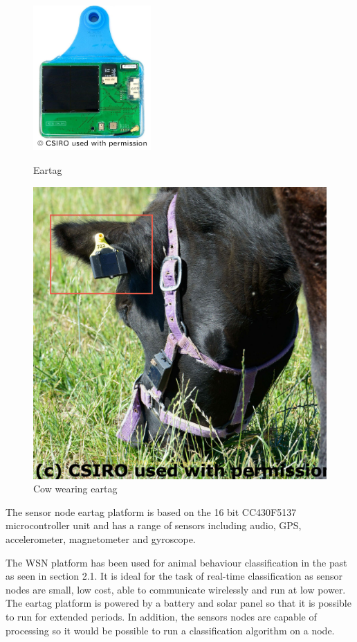 \begin{figure}[ht!]
\centering
\begin{minipage}{.5\textwidth}
  \centering
  \includegraphics[width=0.4\textwidth]{images/eartag.png}
  \caption{Eartag}
  \label{eartag}
\end{minipage}%
\begin{minipage}{.5\textwidth}
  \centering
  \includegraphics[width=.5\textwidth]{images/cow.jpg}
  \caption{Cow wearing eartag}
  \label{cow}
\end{minipage}
\end{figure}

The sensor node eartag platform is based on the 16 bit CC430F5137 microcontroller unit and has a range of sensors including audio, GPS, accelerometer, magnetometer and gyroscope. 

The WSN platform has been used for animal behaviour classification in the past as seen in section 2.1. It is ideal for the task of real-time classification as sensor nodes are small, low cost, able to communicate wirelessly and run at low power. The eartag platform is powered by a battery and solar panel so that it is possible to run for extended periods. In addition, the sensors nodes are capable of processing so it would be possible to run a classification algorithm on a node. 

